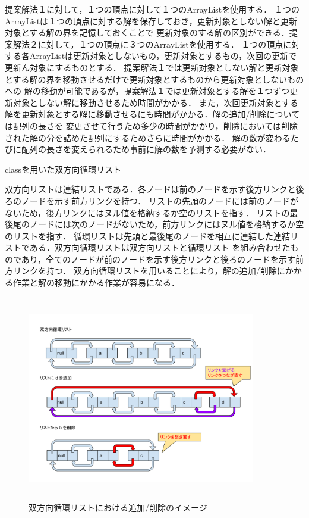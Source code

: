 \documentclass[12pt]{optlab-bachelor}
\begin{document}
提案解法１に対して，１つの頂点に対して１つのArrayListを使用する．
１つのArrayListは１つの頂点に対する解を保存しておき，更新対象としない解と更新対象とする解の界を記憶しておくことで
更新対象のする解の区別ができる．提案解法２に対して，１つの頂点に３つのArrayListを使用する．
１つの頂点に対する各ArrayListは更新対象としないもの，更新対象とするもの，次回の更新で更新ん対象にするものとする．
提案解法１では更新対象としない解と更新対象とする解の界を移動させるだけで更新対象とするものから更新対象としないものへの
解の移動が可能であるが，提案解法１では更新対象とする解を１つずつ更新対象としない解に移動させるため時間がかかる．
また，次回更新対象とする解を更新対象とする解に移動させるにも時間がかかる．解の追加/削除については配列の長さを
変更させて行うため多少の時間がかかり，削除においては削除された解の分を詰めた配列にするためさらに時間がかかる．
解の数が変わるたびに配列の長さを変えられるため事前に解の数を予測する必要がない．

\begin{description}
  \item[classを用いた双方向循環リスト]
\end{description}

双方向リストは連結リストである．各ノードは前のノードを示す後方リンクと後ろのノードを示す前方リンクを持つ．
リストの先頭のノードには前のノードがないため，後方リンクにはヌル値を格納するか空のリストを指す．
リストの最後尾のノードには次のノードがないため，前方リンクにはヌル値を格納するか空のリストを指す．
循環リストは先頭と最後尾のノードを相互に連結した連結リストである．双方向循環リストは双方向リストと循環リスト
を組み合わせたものであり，全てのノードが前のノードを示す後方リンクと後ろのノードを示す前方リンクを持つ．
双方向循環リストを用いることにより，解の追加/削除にかかる作業と解の移動にかかる作業が容易になる．

\begin{figure}[htbp]
  \centering
  \caption{双方向循環リストにおける追加/削除のイメージ}
  \includegraphics[height=9.0cm, width=10.0cm]{fig/fig10.pdf}
\end{figure}
\end{document}
